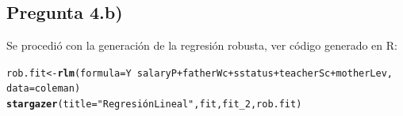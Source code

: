 \documentclass[10pt,a4paper]{article}\usepackage[]{graphicx}\usepackage[]{color}
\makeatletter
\newcommand{\hlstr}[1]{\textcolor[rgb]{0.192,0.494,0.8}{#1}}%
\newcommand{\hlopt}[1]{\textcolor[rgb]{0,0,0}{#1}}%
\newcommand{\hlstd}[1]{\textcolor[rgb]{0.345,0.345,0.345}{#1}}%
\newcommand{\hlkwb}[1]{\textcolor[rgb]{0.69,0.353,0.396}{#1}}%
\newcommand{\hlkwc}[1]{\textcolor[rgb]{0.333,0.667,0.333}{#1}}%
\newcommand{\hlkwd}[1]{\textcolor[rgb]{0.737,0.353,0.396}{\textbf{#1}}}%
\newenvironment{kframe}{%
 \def\at@end@of@kframe{}%
 \ifinner\ifhmode%
  \def\at@end@of@kframe{\end{minipage}}%
  \begin{minipage}{\columnwidth}%
 \fi\fi%
 \def\FrameCommand##1{\hskip\@totalleftmargin \hskip-\fboxsep
 \colorbox{shadecolor}{##1}\hskip-\fboxsep
     \hskip-\linewidth \hskip-\@totalleftmargin \hskip\columnwidth}%
 \MakeFramed {\advance\hsize-\width
   \@totalleftmargin\z@ \linewidth\hsize
   \@setminipage}}%
 {\par\unskip\endMakeFramed%
 \at@end@of@kframe}
\makeatother
\begin{document}
\subsection{Pregunta 4.b)}
Se procedió con la generación de la regresión robusta, ver código generado en R:
\begin{kframe}
\begin{alltt}
\hlstd{rob.fit} \hlkwb{<-} \hlkwd{rlm}\hlstd{(}\hlkwc{formula} \hlstd{= Y} \hlopt{~} \hlstd{salaryP} \hlopt{+} \hlstd{fatherWc} \hlopt{+} \hlstd{sstatus} \hlopt{+} \hlstd{teacherSc} \hlopt{+} \hlstd{motherLev,}
    \hlkwc{data} \hlstd{= coleman)}
\hlkwd{stargazer}\hlstd{(}\hlkwc{title} \hlstd{=} \hlstr{"Regresión Lineal"}\hlstd{, fit, fit_2, rob.fit)}
\end{alltt}
\end{kframe}
\end{document}
